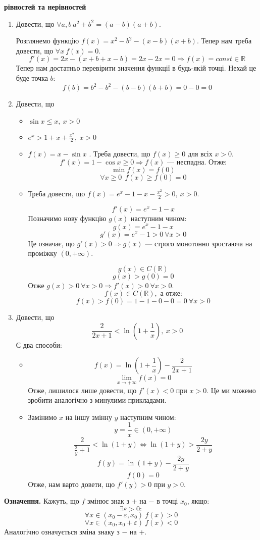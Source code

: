 \documentclass[12pt]{report}
\begin{document}
\begin{center}

\textbf{ рівностей та нерівностей}

\end{center}

\begin{enumerate}
\item 
Довести, що $\forall a,b \ a^2 + b^2 = (a-b)(a+b)$.

Розглянемо функцію $f(x) = x^2 - b^2 - (x-b)(x+b)$. Тепер нам треба довести, що $\forall x\ f(x) = 0$.
$$f'(x) = 2x - (x+b + x - b) = 2x - 2x = 0 \Longrightarrow f(x) = const \in \mathbb{R}$$
Тепер нам достатньо перевірити значення функції в будь-якій точці. Нехай це буде точка $b$:
$$f(b) = b^2 - b^2 - (b-b)(b + b) = 0 - 0 = 0$$
\item Довести, що
\begin{itemize}
\item $\sin x \leq x,\ x > 0$
\item $e^x > 1 + x + \frac{x^2}{2},\ x > 0$
\end{itemize}

\begin{itemize}
\item $f(x) = x - \sin x$	. Треба довести, що $f(x) \geq 0$ для всіх $x > 0$. 
$$f'(x) = 1 - \cos x \geq 0 \Longrightarrow \textrm{$f(x)$ --- неспадна. Отже:}$$
$$\min f(x) = f(0)$$
$$\forall x \geq 0 \ \ f(x) \geq f(0) = 0$$
\item Треба довести, що $f(x) = e^x - 1 - x - \frac{x^2}{2} > 0,\ x > 0$.

$$f'(x) = e^x - 1 - x $$
Позначимо нову функцію $g(x)$ наступним чином:
$$g(x) = e^x - 1 - x$$
$$g'(x) = e^x - 1 > 0\ \forall x > 0$$
Це означає, що $g'(x) > 0 \Longrightarrow g(x)$ --- строго монотонно зростаюча на проміжку $(0, +\infty)$.

$$g(x) \in C(\mathbb{R})$$
$$g(x) > g(0) = 0$$
Отже $g(x) > 0\ \forall x > 0 \Longrightarrow f'(x) > 0 \ \forall x > 0$.
$$f(x) \in C(\mathbb{R}),\textrm{ а отже:}$$
$$f(x) > f(0) = 1 - 1 - 0 - 0 = 0 \ \forall x > 0$$
\end{itemize}
\item 
Довести, що 
$$\frac{2}{2x + 1} < \ln (1 + \frac{1}{x}),\ x > 0$$
Є два способи:
\begin{itemize}
\item 
$$f(x) = \ln (1 + \frac{1}{x}) - \frac{2}{2x + 1}$$
$$\lim_{x \to +\infty}f(x) = 0$$
Отже, лишилося лише довести, що $f'(x) < 0$ при $x > 0$. Це ми можемо зробити аналогічно з минулими прикладами.
\item Замінимо $x$ на іншу змінну $y$ наступним чином: 
$$y = \frac{1}{x} \in (0, +\infty)$$
$$\frac{2}{\frac{2}{y} + 1} < \ln(1 + y) \Longleftrightarrow \ln(1 + y) > \frac{2y}{2 + y}$$
$$f(y) = \ln(1 + y) - \frac{2y}{2 + y}$$
$$f(0) = 0$$
Отже, нам варто довети, що $f'(y) > 0$ при $y > 0$.
\end{itemize}
\end{enumerate}
\textbf{Означення. } Кажуть, що $f$ змінює знак з $+$ на $-$ в точці $x_0$, якщо:
$$\exists \varepsilon > 0:$$
$$\forall x \in (x_0 - \varepsilon, x_0)\ f(x) > 0$$
$$\forall x \in (x_0, x_0 + \varepsilon)\ f(x) < 0$$
Аналогічно означується зміна знаку з $-$ на $+$.
\end{document}

